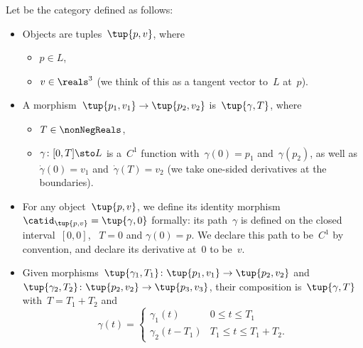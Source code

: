 \begin{definition}[\Berg]
  \label{def:Berg}
  Let \Berg be the category defined as follows:
  \begin{itemize}
    \item Objects are tuples~$\tup{p,v}$, where
    \begin{itemize}
      \item $p \in L$,
      \item $v \in \reals^3$ (we think of this as a tangent vector to~$L$ at~$p$).
    \end{itemize}

    \item A morphism~$\tup{p_1, v_1} \to \tup{p_2, v_2}$ is~$\tup{\gamma, T}$,
    where
    \begin{itemize}
      \item $T \in \nonNegReals$,
      \item $\gamma \colon [0, T] \sto L$ is a~$C^1$ function with~$\gamma(0)=p_1$ and~$\gamma(p_2)$, as well as~$\dot \gamma(0) = v_1$ and~$\dot \gamma(T) = v_2$  (we take one-sided derivatives at the boundaries).
    \end{itemize}
    \item For any object~$\tup{p, v}$, we define its identity morphism~$\catid_{\tup{p,v}} = \tup{\gamma, 0}$ formally: its path~$\gamma$ is defined on the closed interval~$[0,0]$, \text{\ie }~$T=0$ and $\gamma(0) = p$. We declare this path to be~$C^1$ by convention, and declare its derivative at~$0$ to be~$v$.

    \item Given morphisms~$\tup{\gamma_1, T_1}\colon \tup{p_1, v_1} \to \tup{p_2, v_2}$ and~$\tup{\gamma_2, T_2}\colon \tup{p_2, v_2} \to \tup{p_3, v_3}$, their composition is~$\tup{\gamma, T}$ with~$T = T_1 + T_2$ and
    \begin{equation}
      \gamma(t) = \begin{cases}
                    \gamma_1(t) &0 \leq t \leq T_1 \\
                    \gamma_2(t - T_1) & T_1 \leq t \leq T_1 + T_2.
      \end{cases}
    \end{equation}
  \end{itemize}
\end{definition}



